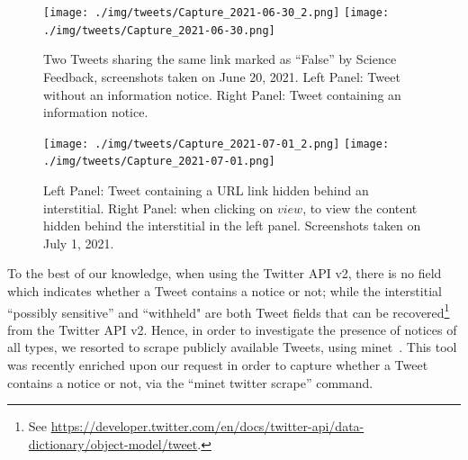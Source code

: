 \documentclass{article}
\begin{document}
\begin{figure}[h]
\centering
		\texttt{[image: ./img/tweets/Capture\_2021-06-30\_2.png]}
		\texttt{[image: ./img/tweets/Capture\_2021-06-30.png]}
	\caption{Two Tweets sharing the same link marked as ``False'' by Science Feedback, screenshots taken on June $20$, 2021. Left Panel: Tweet without an information notice. Right Panel: Tweet containing an information notice.}
	\label{fig8}
\end{figure}

\begin{figure}[h]
	\centering
		\texttt{[image: ./img/tweets/Capture\_2021-07-01\_2.png]} 
		\texttt{[image: ./img/tweets/Capture\_2021-07-01.png]}
	\caption{Left Panel: Tweet containing a URL link hidden behind an interstitial. Right Panel: when clicking on $view$, to view the content hidden behind the interstitial in the left panel. Screenshots taken on July 1, 2021. }
	\label{fig_notice}
\end{figure}

\smallskip

To the best of our knowledge, when using the Twitter API v2, there is no field which indicates whether a Tweet contains a notice or not; while the interstitial ``possibly sensitive'' and ``withheld" are both Tweet fields that can be recovered\footnote{See \href{https://developer.twitter.com/en/docs/twitter-api/data-dictionary/object-model/tweet}{https://developer.twitter.com/en/docs/twitter-api/data-dictionary/object-model/tweet}.} from the Twitter API v2. Hence, in order to investigate the presence of notices of all types, we resorted to scrape publicly available Tweets, using minet~\cite{minet}. This tool was recently enriched upon our request in order to capture whether a Tweet contains a notice or not, via the ``minet twitter scrape'' command.
\end{document}
